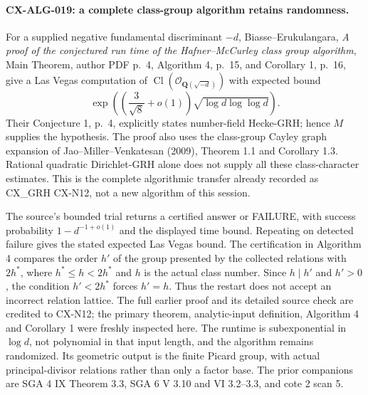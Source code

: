 \documentclass[11pt,a4paper]{article}
\begin{document}
\paragraph{CX-ALG-019: a complete class-group algorithm retains randomness.}
For a supplied negative fundamental discriminant $-d$, Biasse--Erukulangara,
\emph{A proof of the conjectured run time of the Hafner--McCurley class
group algorithm}, Main Theorem, author PDF p.~4, Algorithm 4, p.~15,
and Corollary 1, p.~16, give a Las Vegas computation of
$\operatorname{Cl}(\mathcal O_{\mathbf Q(\sqrt{-d})})$ with expected bound
\[
 \exp\!\left(\left(\frac3{\sqrt8}+o(1)\right)
                         \sqrt{\log d\log\log d}\right).
\]
Their Conjecture 1, p.~4, explicitly states number-field Hecke-GRH; hence
$M$ supplies the hypothesis. The proof also uses the class-group Cayley
graph expansion of Jao--Miller--Venkatesan (2009), Theorem 1.1 and
Corollary 1.3. Rational quadratic Dirichlet-GRH alone does not supply all
these class-character estimates. This is the complete algorithmic transfer
already recorded as CX\_GRH CX-N12, not a new algorithm of this session.

The source's bounded trial returns a certified answer or FAILURE, with
success probability $1-d^{-1+o(1)}$ and the displayed time bound. Repeating
on detected failure gives the stated expected Las Vegas bound. The
certification in Algorithm 4 compares the order $h'$ of the group presented
by the collected relations with $2h^*$, where $h^*\le h<2h^*$ and $h$
is the actual class number. Since $h\mid h'$ and $h'>0$, the condition
$h'<2h^*$ forces $h'=h$. Thus the restart does not accept an incorrect
relation lattice. The full earlier proof and its detailed source check are
credited to CX-N12; the primary theorem, analytic-input definition,
Algorithm 4 and Corollary 1 were freshly inspected here.
The runtime is subexponential in $\log d$, not polynomial in that input
length, and the algorithm remains randomized. Its geometric output is the
finite Picard group, with actual principal-divisor relations rather than
only a factor base. The prior companions are SGA 4 IX Theorem 3.3,
SGA 6 V 3.10 and VI 3.2--3.3, and cote 2 scan 5.
\end{document}
